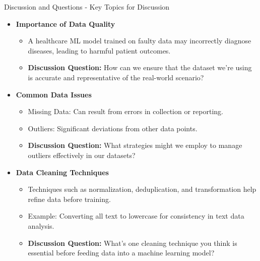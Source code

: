 \documentclass[aspectratio=169]{beamer}
\begin{document}
\begin{frame}[fragile]{Discussion and Questions - Key Topics for Discussion}
    \begin{itemize}
        \item \textbf{Importance of Data Quality}
            \begin{itemize}
                \item A healthcare ML model trained on faulty data may incorrectly diagnose diseases, leading to harmful patient outcomes.
                \item \textbf{Discussion Question:} How can we ensure that the dataset we’re using is accurate and representative of the real-world scenario?
            \end{itemize}
        
        \item \textbf{Common Data Issues}
            \begin{itemize}
                \item Missing Data: Can result from errors in collection or reporting.
                \item Outliers: Significant deviations from other data points.
                \item \textbf{Discussion Question:} What strategies might we employ to manage outliers effectively in our datasets?
            \end{itemize}
        
        \item \textbf{Data Cleaning Techniques}
            \begin{itemize}
                \item Techniques such as normalization, deduplication, and transformation help refine data before training.
                \item Example: Converting all text to lowercase for consistency in text data analysis.
                \item \textbf{Discussion Question:} What’s one cleaning technique you think is essential before feeding data into a machine learning model?
            \end{itemize}
    \end{itemize}
\end{frame}
\end{document}
